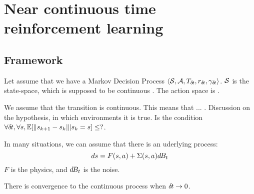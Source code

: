 \section{Near continuous time reinforcement learning}
\label{sec:framework}

\subsection{Framework}

Let assume that we have a Markov Decision Process  $\langle {\cal S}, {\cal A}, T_{{\delta\hspace{-.1em}t}}, r_{\delta\hspace{-.1em}t}, \gamma_{\delta\hspace{-.1em}t}\rangle$. ${\cal S}$ is the state-space, which is supposed to be continuous . The action space is .

We assume that the transition is continuous. This means that ... . Discussion on the hypothesis, in which environments it is true. Is the condition $\forall {\delta\hspace{-.1em}t}, \forall s, \mathbb{E}[\|s_{k+1} - s_k \||s_k = s] \leq ?$. 

In many situations, we can assume that there is an uderlying process:
\begin{equation}
  \label{eq:diffusion}
  ds = F(s, a) + \Sigma(s, a)d\hspace{-.1em}B_t
\end{equation}
$F$ is the physics, and $d\hspace{-.1em}B_t$ is the noise.

There is convergence to the continuous process when ${\delta\hspace{-.1em}t} \rightarrow 0$.

